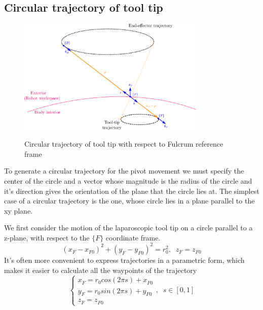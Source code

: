 \subsection{Circular trajectory of tool tip}

\begin{center}
\begin{figure}[!htb]
\centering
\includegraphics[width=0.8\textwidth]{images/circular-trajectory-wrt-fulcrum.png}\\
\caption{Circular trajectory of tool tip with respect to Fulcrum reference frame}
\end{figure}
\end{center}

To generate a circular trajectory for the pivot movement we must specify the center of the circle 
and a vector whose magnitude is the radius of the circle and it’s direction gives the orientation 
of the plane that the circle lies at. The simplest case of a circular trajectory is the one, 
whose circle lies in a plane parallel to the xy plane.


We first consider the motion of the laparoscopic tool tip on a circle parallel to a z-plane, with respect to the $\lbrace F \rbrace$ coordinate frame.
\begin{equation}
(x^{}_{F} - x^{}_{F0})^2 + (y^{}_{F} - y^{}_{F0})^2 = r_0^2, \;\; z^{}_{F} = z^{}_{F0}
\end{equation}
It's often more convenient to express trajectories in a parametric form, which makes it easier to calculate all the waypoints of the trajectory
\begin{equation}
\label{circle-z-plane-traj}
\begin{cases}
x^{}_{F} = r_0cos(2πs) + x^{}_{F0} \\
y^{}_{F} = r_0sin(2πs) + y^{}_{F0} \\
z^{}_{F} = z^{}_{F0}
\end{cases} ,
\;\;
s \in [0, 1]
\end{equation}

